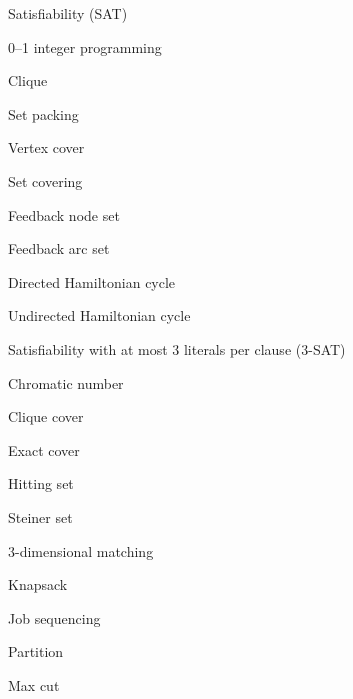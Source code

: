 \documentclass{amsart}
\theoremstyle{plain}
\numberwithin{equation}{section}
\begin{document}
\begin{deepitemize}
  \item Satisfiability (SAT)
    \begin{deepitemize}
      \item 0--1 integer programming
      \item Clique
        \begin{deepitemize}
          \item Set packing
          \item Vertex cover
            \begin{deepitemize}
              \item Set covering
              \item Feedback node set
              \item Feedback arc set
              \item Directed Hamiltonian cycle
                \begin{deepitemize}
                  \item Undirected Hamiltonian cycle
                \end{deepitemize}
            \end{deepitemize}
        \end{deepitemize}
      \item Satisfiability with at most 3 literals per clause (3-SAT)
        \begin{deepitemize}
          \item Chromatic number
            \begin{deepitemize}
              \item Clique cover
              \item Exact cover
                \begin{deepitemize}
                  \item Hitting set
                  \item Steiner set
                  \item 3-dimensional matching
                  \item Knapsack
                    \begin{deepitemize}
                      \item Job sequencing
                      \item Partition
                        \begin{deepitemize}
                          \item Max cut
                        \end{deepitemize}
                    \end{deepitemize}
                \end{deepitemize}
            \end{deepitemize}
        \end{deepitemize}
    \end{deepitemize}
\end{deepitemize}
\end{document}
